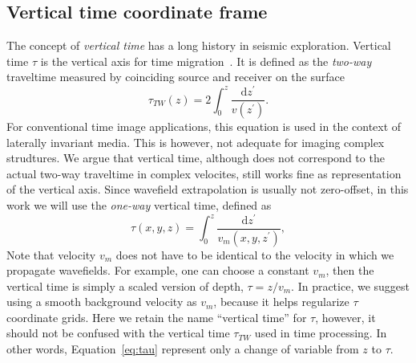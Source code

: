 \subsection{Vertical time coordinate frame}

The concept of \textit{vertical time} has a long history in seismic exploration.
Vertical time $\tau$ is the vertical axis for time migration~\cite[]{yilmaz2001sda,claerbout-iei}.
It is defined as the \textit{two-way} traveltime measured by coinciding source and receiver on the surface
\begin{equation}\label{eq:tautw}
  \tau_{TW}(z) = 2 \int_0^z \frac{\mathrm{d} z^\prime}{v(z^\prime)} .
\end{equation}
For conventional time image applications, this equation is used in the context of laterally invariant media.
This is however, not adequate for imaging complex strudtures.
We argue that vertical time, although does not correspond to the actual two-way traveltime in complex velocites, still works fine as representation of the vertical axis.
Since wavefield extrapolation is usually not zero-offset, in this work we will use the \textit{one-way} vertical time, defined as
\begin{equation}
  \label{eq:tau}
  \tau(x,y,z) = \int_0^z \frac{\mathrm{d} z^\prime}{v_m(x,y,z^\prime)} ,
\end{equation}
Note that velocity $v_m$ does not have to be identical to the velocity in which we propagate wavefields. For example, one can choose a constant $v_m$, then the vertical time is simply a scaled version of depth, $\tau = z / v_m$.
In practice, we suggest using a smooth background velocity as $v_m$, because it helps regularize $\tau$ coordinate grids.
Here we retain the name ``vertical time'' for $\tau$, however, it should not be confused with the vertical time $\tau_{TW}$ used in time processing.
In other words, Equation~\ref{eq:tau} represent only a change of variable from $z$ to $\tau$.

